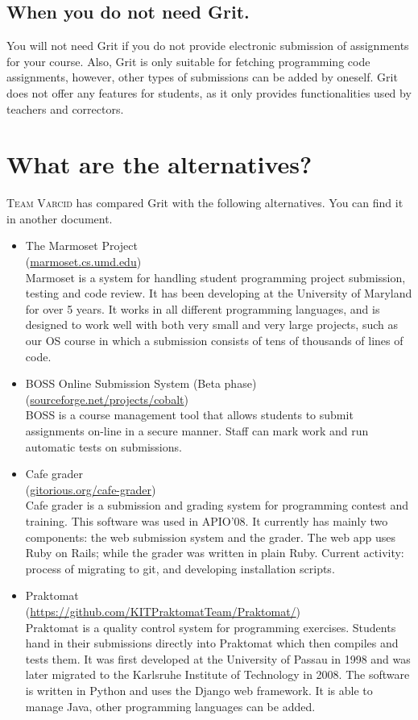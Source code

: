 \documentclass[10pt,a4paper, titlepage, toc=idx]{scrreprt}
\theoremstyle{definition}
\theoremstyle{plain}
\newcommand*{\product}{Grit}
\begin{document}
\subsection*{When you do not need \product.}
You will not need \product{} if you do not provide electronic submission of
assignments for your course. Also, \product{} is only suitable for
fetching programming code assignments, however, other types of
submissions can be added by oneself.  \product{} does not offer any
features for students, as it only provides functionalities used by
teachers and correctors.
\section{What are the alternatives?}
\textsc{Team Varcid} has compared \product{} with the following alternatives. You can find it in another document.
\begin{itemize}
\item The Marmoset Project \\
  (\url{marmoset.cs.umd.edu}) \\
  Marmoset is a system for handling student programming project
  submission, testing and code review. It has been developing at the
  University of Maryland for over 5 years. It works in all different
  programming languages, and is designed to work well with both very
  small and very large projects, such as our OS course in which a
  submission consists of tens of thousands of lines of code.
\item BOSS Online Submission System (Beta phase) \\
  (\url{sourceforge.net/projects/cobalt}) \\
  BOSS is a course management tool that allows students to submit
  assignments on-line in a secure manner. Staff can mark work and run
  automatic tests on submissions.
\item Cafe grader \\
  (\url{gitorious.org/cafe-grader}) \\
  Cafe grader is a submission and grading system for programming
  contest and training.  This software was used in APIO'08. It
  currently has mainly two components: the web submission system and
  the grader. The web app uses Ruby on Rails; while the grader was
  written in plain Ruby. Current activity: process of migrating to
  git, and developing installation scripts.
\item Praktomat \\
  (\url{https://github.com/KITPraktomatTeam/Praktomat/})
  \\
  Praktomat is a quality control system for programming
  exercises. Students hand in their submissions directly into
  Praktomat which then compiles and tests them. It was first developed
  at the University of Passau in 1998 and was later migrated to the
  Karlsruhe Institute of Technology in 2008.  The software is written
  in Python and uses the Django web framework. It is able to manage
  Java, other programming languages can be added.
\end{itemize}
\end{document}
